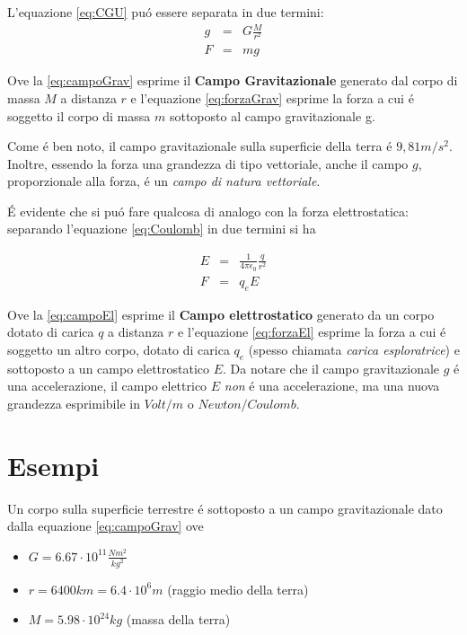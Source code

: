 \documentclass[17pt]{extarticle}
\begin{document}
L'equazione \ref{eq:CGU} pu\'o essere separata in due termini: 
\begin{eqnarray}\label{eq:campoGrav}
	g & = & G\frac{M}{r^2}\\ \label{eq:forzaGrav}
	F & = & mg
\end{eqnarray}

Ove la \ref{eq:campoGrav} esprime il {\bf Campo Gravitazionale} generato dal corpo di massa $M$ a distanza $r$ e l'equazione \ref{eq:forzaGrav} esprime la forza a cui \'e soggetto il corpo di massa $m$ sottoposto al campo gravitazionale g. 

Come \'e ben noto, il campo gravitazionale sulla superficie della terra \'e $9,81m/s^2$. Inoltre, essendo la forza una grandezza di tipo vettoriale, anche il campo $g$, proporzionale alla forza, \'e un \emph{campo di natura vettoriale}. 

\'E evidente che si pu\'o fare qualcosa di analogo con la forza elettrostatica: separando l'equazione \ref{eq:Coulomb} in due termini si ha


\begin{eqnarray}\label{eq:campoEl}
	E & = & \frac{1}{4\pi\epsilon_0}\frac{q}{r^2}\\ \label{eq:forzaEl}
	F & = & q_{e}E
\end{eqnarray}



Ove la \ref{eq:campoEl} esprime il {\bf Campo elettrostatico} generato da un corpo dotato di carica $q$ a distanza $r$ e l'equazione \ref{eq:forzaEl} esprime la forza a cui \'e soggetto un altro corpo, dotato di carica $q_{e}$ (spesso chiamata \emph{carica esploratrice}) e sottoposto a un campo elettrostatico $E$. Da notare che il campo gravitazionale $g$ \'e una accelerazione, il campo elettrico $E$ \emph{non} \'e una accelerazione, ma una nuova grandezza esprimibile in $Volt/m$ o $Newton/Coulomb$.

\section{Esempi}

Un corpo sulla superficie terrestre \'e sottoposto a un campo gravitazionale dato dalla equazione \ref{eq:campoGrav} ove
\begin{itemize}
	\item $G = 6.67\cdot 10^{11}\frac{Nm^2}{kg^2}$
	\item $r = 6400km = 6.4\cdot 10^{6}m$ (raggio medio della terra)
	\item $M = 5.98\cdot 10^{24}kg$ (massa della terra)
\end{itemize}
\end{document}
